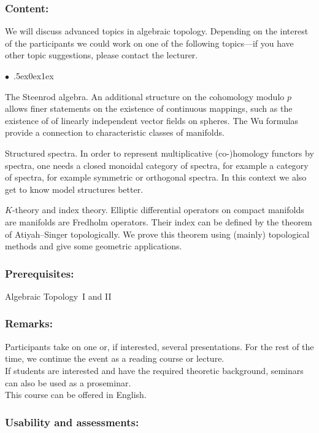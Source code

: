 \documentclass[a4paper,10pt]{article}
\renewenvironment{itemize}{\begin{list}{$\bullet$\ }{\itemsep.5ex\setlength{\topsep}{0.5\itemsep}\parsep0ex\labelsep1ex\settowidth{\labelwidth}{$\bullet$\ }\setlength{\leftmargin}{\labelwidth}\addtolength{\leftmargin}{3ex}\addtolength{\leftmargin}{\labelsep}}}{\end{list}}
\begin{document}
\subsubsection*{\large
    Content:
}
We will discuss advanced topics in algebraic topology.
Depending on the interest of the participants we could work on one of the following topics---if you have other topic suggestions, please contact the lecturer.
\begin{itemize}
\item The Steenrod algebra. An additional structure on the cohomology modulo $p$
allows finer statements on the existence of continuous mappings, such as the existence of of linearly independent vector fields on spheres. The Wu formulas provide a connection to characteristic classes of manifolds.
\item Structured spectra. In order to represent multiplicative (co-)homology functors
by spectra, one needs a closed monoidal category of spectra, for example a category of spectra, for example
symmetric or orthogonal spectra. In this context
we also get to know model structures better.
\item $K$-theory and index theory. Elliptic differential operators on compact manifolds are manifolds are Fredholm operators. Their index can be defined by the theorem of Atiyah--Singer topologically. We prove this theorem using (mainly) topological methods and give some geometric applications.
\end{itemize} 
\subsubsection*{\large
    Prerequisites:
}
Algebraic Topology~I and II
\subsubsection*{\large
    Remarks:
}
Participants take on one or, if interested, several presentations. For the rest of the time, we continue the event as a reading course or lecture. \\ If students are interested and have the required theoretic background, seminars can also be used as a proseminar. \\ This course can be offered in English.
\cleardoublepage
\subsubsection*{\large
    Usability and assessments:
}
\end{document}
